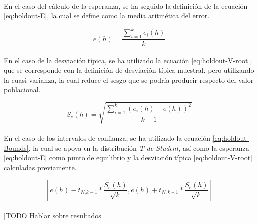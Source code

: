 \documentclass{article}
\begin{document}
		\paragraph{}
		En el caso del cálculo de la esperanza, se ha seguido la definición de la ecuación \eqref{eq:holdout-E}, la cual se define como la media aritmética del error.

		\begin{equation}
		\label{eq:holdout-E}
				e(h) = \frac{\sum_{i=1}^k e_i(h)}{k}
		\end{equation}

		\paragraph{}
		En el caso de la desviación típica, se ha utilizado la ecuación \eqref{eq:holdout-V-root}, que se corresponde con la definición de desviación típica muestral, pero utilizando la cuasi-varianza, la cual reduce el sesgo que se podría producir respecto del valor poblacional.

		\begin{equation}
		\label{eq:holdout-V-root}
				S_e(h) = \sqrt{\frac{\sum_{i=1}^k (e_i(h)-e(h))^2}{k-1}}
		\end{equation}


		\paragraph{}
		En el caso de los intervalos de confianza, se ha utilizado la ecuación \eqref{eq:holdout-Bounds}, la cual se apoya en la distribución \emph{T de Student}, así como la esperanza \eqref{eq:holdout-E} como punto de equilibrio y la desviación típica \eqref{eq:holdout-V-root} calculadas previamente.

		\begin{equation}
		\label{eq:holdout-Bounds}
			[e(h)-t_{N, k-1} * \frac{S_e(h)}{\sqrt{k}},e(h)+t_{N, k-1} * \frac{S_e(h)}{\sqrt{k}}]
		\end{equation}

		\paragraph{}
		[TODO Hablar sobre resultados]
\end{document}
